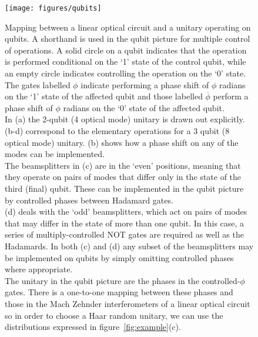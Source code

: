 \documentclass[aps,prl,twocolumn,floatfix]{revtex4}
\begin{document}
\begin{figure}[p]
  \texttt{[image: figures/qubits]}
  \caption{Mapping between a linear optical circuit and a unitary operating on
    qubits. A shorthand is used in the qubit picture for multiple control of
    operations. A solid circle on a qubit indicates that the operation is
    performed conditional on the `1' state of the control qubit, while an empty
    circle indicates controlling the operation on the `0' state. The gates
    labelled \(\phi\) indicate performing a phase shift of \(\phi\) radians on
    the `1' state of the affected qubit and those labelled \(\overline{\phi}\)
    perform a phase shift of \(\phi\) radians on the `0' state of the affected
    qubit. \\
    In (a) the 2-qubit (4 optical mode) unitary is drawn out explicitly.
    (b-d) correspond to the elementary operations for a 3 qubit (8 optical mode)
    unitary. (b) shows how a phase shift on any of the modes can be
    implemented. \\
    The beamsplitters in (c) are in the `even' positions, meaning that they
    operate on pairs of modes that differ only in the state of the third (final)
    qubit. These can be implemented in the qubit picture by controlled phases
    between Hadamard gates. \\
    (d) deals with the `odd' beamsplitters, which act on
    pairs of modes that may differ in the state of more than one qubit. In this
    case, a series of multiply-controlled NOT gates are required as well as the
    Hadamards. In both (c) and (d) any subset of the beamsplitters may be
    implemented on qubits by simply omitting controlled phases where
    appropriate. \\
    The unitary in the qubit picture are the phases in the controlled-\(\phi\)
    gates. There is a one-to-one mapping between these phases and those in the
    Mach Zehnder interferometers of a linear optical circuit so in order to
    choose a Haar random unitary, we can use the distributions expressed in
    figure~\ref{fig:example}(c).}
  \label{fig:qubits}
\end{figure}
  

\end{document}
